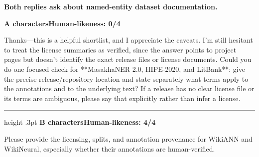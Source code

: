 \begin{minipage}{.96\linewidth}
\small
\textbf{Both replies ask about named-entity dataset documentation.}\par
\vspace{8pt}
{\color{error}\bfseries A characters\quad Human-likeness: 0/4}\par
\vspace{4pt}
Thanks—this is a helpful shortlist, and I appreciate the caveats. I’m still hesitant to treat the license summaries as verified, since the answer points to project pages but doesn’t identify the exact release files or license documents. Could you do one focused check for **MasakhaNER 2.0, HIPE-2020, and LitBank**: give the precise release/repository location and state separately what terms apply to the annotations and to the underlying text? If a release has no clear license file or its terms are ambiguous, please say that explicitly rather than infer a license.\par
\vspace{9pt}\hrule height .3pt\vspace{9pt}
{\color{researcher}\bfseries B characters\quad Human-likeness: 4/4}\par
\vspace{4pt}
Please provide the licensing, splits, and annotation provenance for WikiANN and WikiNeural, especially whether their annotations are human-verified.\par
\end{minipage}
